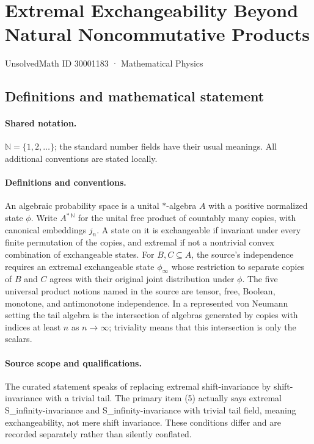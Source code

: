 \documentclass[11pt]{article}
\begin{document}
\setcounter{section}{30001182}
\section{Extremal Exchangeability Beyond Natural Noncommutative Products}\label{30001183}
{\small UnsolvedMath ID 30001183 · Mathematical Physics}
\subsection{Definitions and mathematical statement}

\paragraph{Shared notation.}$\mathbb N=\{1,2,\ldots\}$; the standard number fields have their usual meanings. All additional conventions are stated locally.


\paragraph{Definitions and conventions.} An algebraic probability space is a unital $*$-algebra $A$ with a positive normalized state $\phi$. Write $A^{*\,\mathbb N}$ for the unital free product of countably many copies, with canonical embeddings $j_n$. A state on it is exchangeable if invariant under every finite permutation of the copies, and extremal if not a nontrivial convex combination of exchangeable states. For $B,C\subseteq A$, the source's independence requires an extremal exchangeable state $\phi_\infty$ whose restriction to separate copies of $B$ and $C$ agrees with their original joint distribution under $\phi$. The five universal product notions named in the source are tensor, free, Boolean, monotone, and antimonotone independence. In a represented von Neumann setting the tail algebra is the intersection of algebras generated by copies with indices at least $n$ as $n\to\infty$; triviality means that this intersection is only the scalars.

\paragraph{Source scope and qualifications.} The curated statement speaks of replacing extremal shift-invariance by shift-invariance with a trivial tail. The primary item (5) actually says extremal S\_infinity-invariance and S\_infinity-invariance with trivial tail field, meaning exchangeability, not mere shift invariance. These conditions differ and are recorded separately rather than silently conflated.
\end{document}
